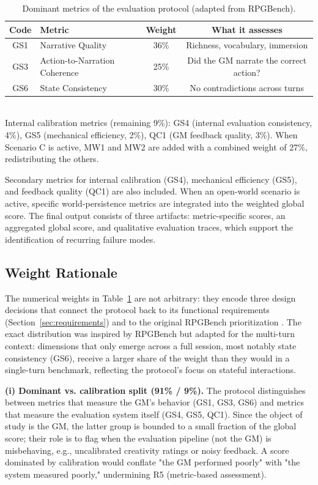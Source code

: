 \documentclass[12pt]{article}
\begin{document}
\begin{table}[ht]
\centering
\caption{Dominant metrics of the evaluation protocol (adapted from RPGBench).}
\label{tab:metrics}
\begin{tabular}{clcc}
\toprule
\textbf{Code} & \textbf{Metric} & \textbf{Weight} & \textbf{What it assesses} \\
\midrule
GS1 & Narrative Quality            & 36\% & Richness, vocabulary, immersion \\
GS3 & Action-to-Narration Coherence & 25\% & Did the GM narrate the correct action? \\
GS6 & State Consistency             & 30\% & No contradictions across turns \\
\bottomrule
\end{tabular}
\\[2pt]
{\footnotesize Internal calibration metrics (remaining 9\%): GS4 (internal evaluation consistency, 4\%), GS5 (mechanical efficiency, 2\%), QC1 (GM feedback quality, 3\%). When Scenario C is active, MW1 and MW2 are added with a combined weight of 27\%, redistributing the others.}
\end{table}

Secondary metrics for internal calibration (GS4), mechanical efficiency (GS5), and feedback quality (QC1) are also included. When an open-world scenario is active, specific world-persistence metrics are integrated into the weighted global score. The final output consists of three artifacts: metric-specific scores, an aggregated global score, and qualitative evaluation traces, which support the identification of recurring failure modes.

\subsection{Weight Rationale}
\label{sec:weights}

The numerical weights in Table~\ref{tab:metrics} are not arbitrary: they encode three design decisions that connect the protocol back to its functional requirements (Section~\ref{sec:requirements}) and to the original RPGBench prioritization \cite{yu:2025}. The exact distribution was inspired by RPGBench but adapted for the multi-turn context: dimensions that only emerge across a full session, most notably state consistency (GS6), receive a larger share of the weight than they would in a single-turn benchmark, reflecting the protocol's focus on stateful interactions.

\textbf{(i) Dominant vs. calibration split (91\% / 9\%).} The protocol distinguishes between metrics that measure the GM's behavior (GS1, GS3, GS6) and metrics that measure the evaluation system itself (GS4, GS5, QC1). Since the object of study is the GM, the latter group is bounded to a small fraction of the global score; their role is to flag when the evaluation pipeline (not the GM) is misbehaving, e.g., uncalibrated creativity ratings or noisy feedback. A score dominated by calibration would conflate "the GM performed poorly" with "the system measured poorly," undermining R5 (metric-based assessment).
\end{document}
